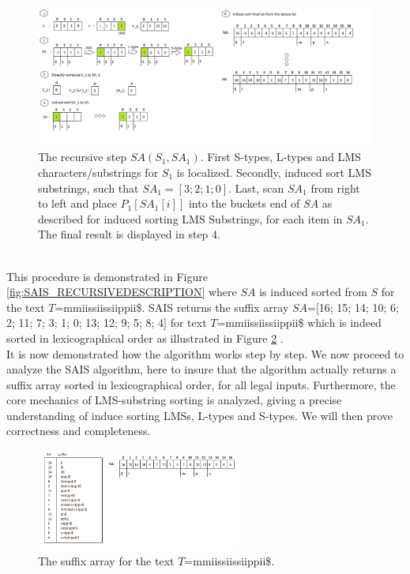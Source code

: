 \documentclass[12pt]{article} %
\begin{document}
\begin{figure}[H]
    \centering
    \includegraphics[width=1.0\textwidth]{SAIS_RECURSIVE}
    \captionsetup{width=0.8\textwidth}
    \caption{The recursive step $SA(S_1, SA_1)$.  First S-types, L-types and LMS characters/substrings for $S_1$ is localized. Secondly, induced sort LMS substrings, such that $SA_1 = [3;2;1;0]$. Last, scan $SA_1$ from right to left and place $P_1[SA_1[i]]$ into the buckets end of $SA$ as described for induced sorting LMS Substrings, for each item in $SA_1$. The final result is displayed in step 4.}
    \label{fig:SAIS_RECURSIVE}
    
\end{figure}
\\
This procedure is demonstrated in Figure \ref{fig:SAIS_RECURSIVEDESCRIPTION} where $SA$ is induced sorted from $S$ for the text $T$=mmiissiissiippii\$. SAIS returns the suffix array $SA$=[16; 15; 14; 10; 6; 2; 11; 7; 3; 1; 0; 13; 12; 9; 5; 8; 4] for text $T$=mmiissiissiippii\$ which is indeed sorted in lexicographical order as illustrated in Figure \ref{fig:SAIS_Sortedorder} \cite{twoeffecient}.
\\
It is now demonstrated how the algorithm works step by step. We now proceed to analyze the SAIS algorithm, here to insure that the algorithm actually returns a suffix array sorted in lexicographical order, for all legal inputs. Furthermore, the core mechanics of LMS-substring sorting is analyzed, giving a precise understanding of induce sorting LMSs, L-types and S-types. We will then prove correctness and completeness.

\begin{figure}[H]
    \centering
    \includegraphics[width=0.6\textwidth]{SAIS_Sortedorder}
    \captionsetup{width=0.8\textwidth}
    \caption{The suffix array for the text $T$=mmiissiissiippii\$.}
    \label{fig:SAIS_Sortedorder}  
\end{figure}
\end{document}
